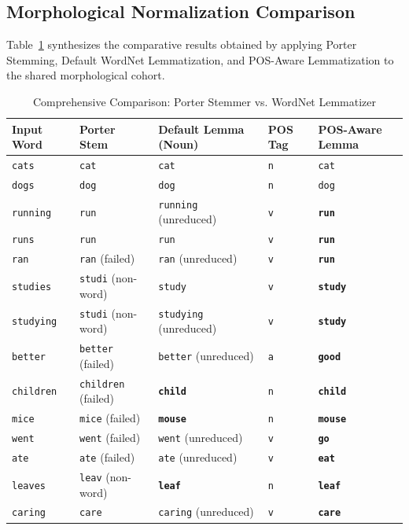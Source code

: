 \subsection{Morphological Normalization Comparison}
Table~\ref{tab:exp3_morph_comparison} synthesizes the comparative results obtained by applying Porter Stemming, Default WordNet Lemmatization, and POS-Aware Lemmatization to the shared morphological cohort.
\begin{table}[H]
\centering
\small
\caption{Comprehensive Comparison: Porter Stemmer vs. WordNet Lemmatizer}
\label{tab:exp3_morph_comparison}
\begin{tabular}{lllll}
\toprule
\textbf{Input Word} & \textbf{Porter Stem} & \textbf{Default Lemma (Noun)} & \textbf{POS Tag} & \textbf{POS-Aware Lemma} \\
\midrule
\texttt{cats} & \texttt{cat} & \texttt{cat} & \texttt{n} & \texttt{cat} \\
\texttt{dogs} & \texttt{dog} & \texttt{dog} & \texttt{n} & \texttt{dog} \\
\texttt{running} & \texttt{run} & \texttt{running} (unreduced) & \texttt{v} & \textbf{\texttt{run}} \\
\texttt{runs} & \texttt{run} & \texttt{run} & \texttt{v} & \textbf{\texttt{run}} \\
\texttt{ran} & \texttt{ran} (failed) & \texttt{ran} (unreduced) & \texttt{v} & \textbf{\texttt{run}} \\
\texttt{studies} & \texttt{studi} (non-word) & \texttt{study} & \texttt{v} & \textbf{\texttt{study}} \\
\texttt{studying} & \texttt{studi} (non-word) & \texttt{studying} (unreduced) & \texttt{v} & \textbf{\texttt{study}} \\
\texttt{better} & \texttt{better} (failed) & \texttt{better} (unreduced) & \texttt{a} & \textbf{\texttt{good}} \\
\texttt{children} & \texttt{children} (failed) & \textbf{\texttt{child}} & \texttt{n} & \textbf{\texttt{child}} \\
\texttt{mice} & \texttt{mice} (failed) & \textbf{\texttt{mouse}} & \texttt{n} & \textbf{\texttt{mouse}} \\
\texttt{went} & \texttt{went} (failed) & \texttt{went} (unreduced) & \texttt{v} & \textbf{\texttt{go}} \\
\texttt{ate} & \texttt{ate} (failed) & \texttt{ate} (unreduced) & \texttt{v} & \textbf{\texttt{eat}} \\
\texttt{leaves} & \texttt{leav} (non-word) & \textbf{\texttt{leaf}} & \texttt{n} & \textbf{\texttt{leaf}} \\
\texttt{caring} & \texttt{care} & \texttt{caring} (unreduced) & \texttt{v} & \textbf{\texttt{care}} \\
\bottomrule
\end{tabular}
\end{table}

